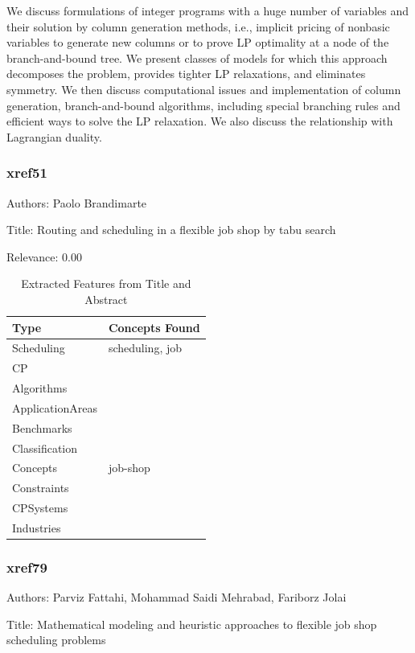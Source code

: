   We discuss formulations of integer programs with a huge number of variables and their solution by column generation methods, i.e., implicit pricing of nonbasic variables to generate new columns or to prove LP optimality at a node of the branch-and-bound tree. We present classes of models for which this approach decomposes the problem, provides tighter LP relaxations, and eliminates symmetry. We then discuss computational issues and implementation of column generation, branch-and-bound algorithms, including special branching rules and efficient ways to solve the LP relaxation. We also discuss the relationship with Lagrangian duality.  

\subsubsection{xref51}
\label{mw:xref51}

Authors: Paolo Brandimarte

Title: Routing and scheduling in a flexible job shop by tabu search

Relevance:  0.00

{\scriptsize
\begin{longtable}{p{2cm}p{20cm}}
\caption{Extracted Features from Title and Abstract}\\ \toprule
Type & Concepts Found\\ \midrule
\endhead
\bottomrule
\endfoot
Scheduling & scheduling, job\\ 
CP & \\ 
Algorithms & \\ 
ApplicationAreas & \\ 
Benchmarks & \\ 
Classification & \\ 
Concepts & job-shop\\ 
Constraints & \\ 
CPSystems & \\ 
Industries & \\ 
\end{longtable}
}



\subsubsection{xref79}
\label{mw:xref79}

Authors: Parviz Fattahi, Mohammad Saidi Mehrabad, Fariborz Jolai

Title: Mathematical modeling and heuristic approaches to flexible job shop scheduling problems

